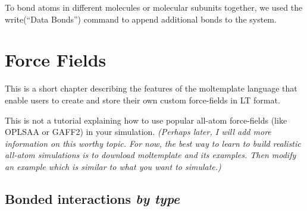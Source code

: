 \documentclass[11pt]{article}
\begin{document}
To bond atoms in different molecules or molecular subunits together, we used 
the write(``Data Bonds'') command to append additional bonds to the system.



\section{Force Fields}
\label{sec:force_fields}

This is a short chapter describing the features of the
moltemplate language that enable users to create and store their own
custom force-fields in LT format.

This is not a tutorial explaining how to use popular all-atom force-fields
(like OPLSAA or GAFF2) in your simulation.
\textit{(Perhaps later, I will add more information on this worthy topic.
For now, the best way to learn to build realistic all-atom
simulations is to download moltemplate and its examples.
Then modify an example which is similar to what you want to simulate.)}


\subsection{Bonded interactions \textit{by type}}
\label{sec:nbody_by_type_intro}
\end{document}
